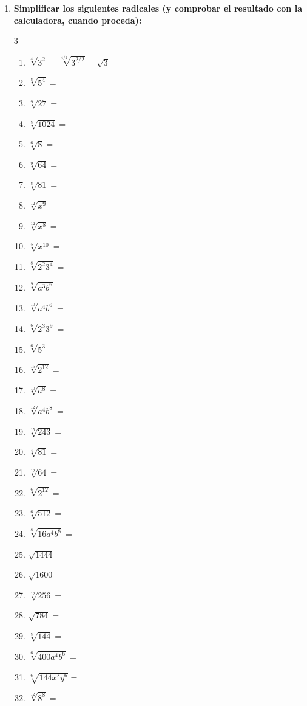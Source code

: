 \documentclass[10pt, a4paper]{article}
\begin{document}
\begin{enumerate}
    \item \textbf{Simplificar los siguientes radicales (y comprobar el resultado con la calculadora, cuando proceda):}
    \begin{multicol}{3}
    \begin{enumerate}[label=\alph*)]
        \item $\sqrt[4]{3^2} = \sqrt[4/2]{3^{2/2}} = \sqrt{3}$
        \item $\sqrt[8]{5^4} =$
        \item $\sqrt[9]{27} =$
        \item $\sqrt[5]{1024} =$
        \item $\sqrt[6]{8} =$
        \item $\sqrt[9]{64} =$
        \item $\sqrt[8]{81} =$
        \item $\sqrt[12]{x^9} =$
        \item $\sqrt[12]{x^8} =$
        \item $\sqrt[5]{x^{10}} =$
        \item $\sqrt[8]{2^2 3^4} =$
        \item $\sqrt[9]{a^3 b^6} =$
        \item $\sqrt[10]{a^4 b^6} =$
        \item $\sqrt[6]{2^3 3^9} =$
        \item $\sqrt[6]{5^3} =$
        \item $\sqrt[15]{2^{12}} =$
        \item $\sqrt[10]{a^8} =$
        \item $\sqrt[12]{a^4 b^8} =$
        \item $\sqrt[15]{243} =$
        \item $\sqrt[4]{81} =$
        \item $\sqrt[12]{64} =$
        \item $\sqrt[6]{2^{12}} =$
        \item $\sqrt[6]{512} =$
        \item $\sqrt[8]{16 a^4 b^8} =$
        \item $\sqrt{1444} =$
        \item $\sqrt{1600} =$
        \item $\sqrt[12]{256} =$
        \item $\sqrt{784} =$
        \item $\sqrt[5]{144} =$
        \item $\sqrt[6]{400 a^4 b^6} =$
        \item $\sqrt[6]{144 x^2 y^6} =$
        \item $\sqrt[12]{8^8} =$
    \end{enumerate}
    \end{multicol}


\end{enumerate}
\end{document}

